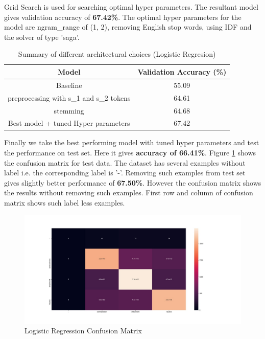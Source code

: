 \documentclass[10pt,a4paper]{article}
\begin{document}
Grid Search is used for searching optimal hyper parameters. The resultant model gives validation accuracy of \textbf{67.42\%}. The optimal hyper parameters for the model are ngram\_range of (1, 2), removing English stop words, using IDF and the solver of type 'saga'.

\begin{table}[h!]
\centering
\begin{tabular}{|c| c|} 
 \hline
 Model & Validation Accuracy (\%) \\
 \hline\hline
 Baseline & 55.09 \\ 
 \hline
 preprocessing with s\_1 and s\_2 tokens & 64.61 \\ 
 \hline
 stemming & 64.68 \\ 
 \hline
 Best model + tuned Hyper parameters & 67.42 \\ 
 \hline
\end{tabular}
\caption{Summary of different architectural choices (Logistic Regresion)}
\label{table:2}
\end{table}

Finally we take the best performing model with tuned hyper parameters and test the performance on test set. Here it gives \textbf{accuracy of 66.41\%}. Figure \ref{mlpcm} shows the confusion matrix for test data. The dataset has several examples without label i.e. the corresponding label is '-'. Removing such examples from test set gives slightly better performance of \textbf{67.50\%}. However the confusion matrix shows the results without removing such examples. First row and column of confusion matrix shows such label less examples.
	
\begin{figure}[h!]
	\includegraphics[width=1.3\linewidth]{cm_lr.jpg}
	\caption{Logistic Regression Confusion Matrix}
	\label{mlpcm}
\end{figure}
\end{document}
